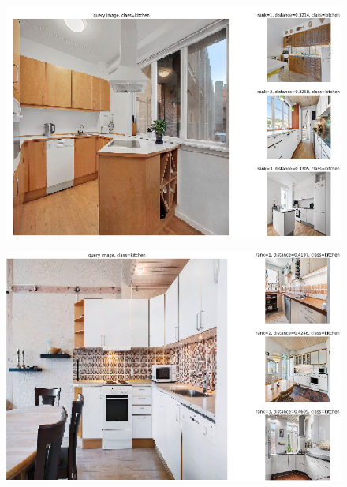 \begin{figure}[H]
    \centering
    \includegraphics[width =\textwidth]{pictures/random/efnkitchenplot}
\end{figure}

\begin{figure}[H]
    \centering
    \includegraphics[width =\textwidth]{pictures/random/efnkitchenplot1}
\end{figure}

